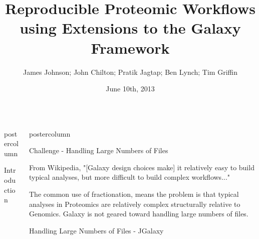 \documentclass[final]{beamer}
\title{\huge Reproducible Proteomic Workflows using Extensions to the Galaxy Framework}
\author[Johnson, Chilton, et al]{James Johnson; John Chilton; Pratik Jagtap; Ben Lynch; Tim Griffin}
\institute[]{University of Minnesota Supcomputing Institute}
\date{June 10th, 2013}
\newlength{\columnheight}
\begin{document}
\begin{frame}
  \begin{columns}

    \begin{column}{.33\textwidth}
      \begin{beamercolorbox}[center,wd=\textwidth]{postercolumn}
        \begin{minipage}[T]{.95\textwidth}  %
          \parbox[t][\columnheight]{\textwidth}{
            \begin{block}{Introduction}


            \end{block}
            \vfill
          }
        \end{minipage}
      \end{beamercolorbox}
    \end{column}

    \begin{column}{.33\textwidth}
      \begin{beamercolorbox}[center,wd=\textwidth]{postercolumn}
        \begin{minipage}[T]{.95\textwidth} %
          \parbox[t][\columnheight]{\textwidth}{
            \begin{block}{Challenge - Handling Large Numbers of Files}

            From Wikipedia, "[Galaxy design choices make] it relatively easy
            to build typical analyses, but more difficult to build complex
            workflows..."

            The common use of fractionation, means the problem is that typical
            analyses in Proteomics are relatively complex structurally
            relative to Genomics. Galaxy is not geared toward handling large
            numbers of files.

            \end{block}
            \vfill
            \begin{block}{Handling Large Numbers of Files - JGalaxy}


\end{block}}
\end{minipage}
\end{beamercolorbox}
\end{column}
\end{columns}
\end{frame}
\end{document}
